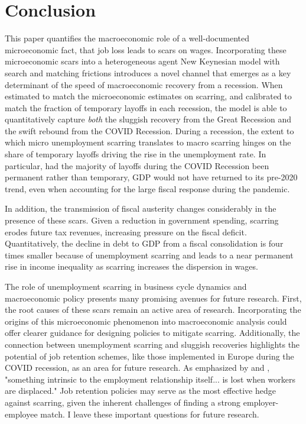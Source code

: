 
\section{Conclusion}

This paper quantifies the macroeconomic role of a well-documented microeconomic fact, that job loss leads to scars on wages. Incorporating these microeconomic scars into a heterogeneous agent New Keynesian model with search and matching frictions introduces a novel channel that emerges as a key determinant of the speed of macroeconomic recovery from a recession. When estimated to match the microeconomic estimates on scarring, and calibrated to match the fraction of temporary layoffs in each recession, the model is able to quantitatively capture \textit{both} the sluggish recovery from the Great Recession and the swift rebound from the COVID Recession. During a recession, the extent to which micro unemployment scarring translates to macro scarring hinges on the share of temporary layoffs driving the rise in the unemployment rate. In particular, had the majority of layoffs during the COVID Recession been permanent rather than temporary, GDP would not have returned to its pre-2020 trend, even when accounting for the large fiscal response during the pandemic.

In addition, the transmission of fiscal austerity changes considerably in the presence of these scars. Given a reduction in government spending, scarring erodes future tax revenues, increasing pressure on the fiscal deficit. Quantitatively, the decline in debt to GDP from a fiscal consolidation is four times smaller because of unemployment scarring and leads to a near permanent rise in income inequality as scarring increases the dispersion in wages. 


The role of unemployment scarring in business cycle dynamics and macroeconomic policy presents many promising avenues for future research. First, the root causes of these scars remain an active area of research. Incorporating the origins of this microeconomic phenomenon into macroeconomic analysis could offer clearer guidance for designing policies to mitigate scarring. Additionally, the connection between unemployment scarring and sluggish recoveries highlights the potential of job retention schemes, like those implemented in Europe during the COVID recession, as an area for future research. As emphasized by \cite{Lachowska2020} and \cite{Jacobson1993}, "something intrinsic to the employment relationship itself... is lost when workers are displaced." Job retention policies may serve as the most effective hedge against scarring, given the inherent challenges of finding a strong employer-employee match. I leave these important questions for future research.


